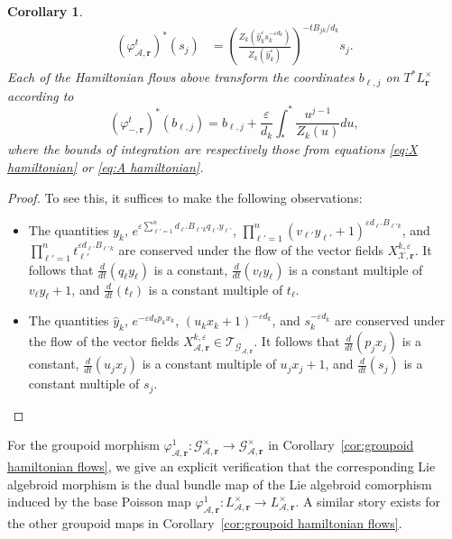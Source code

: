 \documentclass{amsart}
\newtheorem{corollary}[theorem]{Corollary}
\numberwithin{equation}{section}
\newcommand{\bfr}{{\boldsymbol{r}}}
\newcommand{\cA}{\mathcal{A}}
\newcommand{\cG}{\mathcal{G}}
\newcommand{\cT}{\mathcal{T}}
\newcommand{\cX}{\mathcal{X}}
\begin{document}
\begin{corollary}
\begin{align*}
    (\varphi_{\cA,\bfr}^t)^*(s_j)&=\left(\frac{Z_k\left(\hat y_k^\varepsilon s_k^{-\varepsilon d_k}\right)}{Z_k(\hat y_k^\varepsilon)}\right)^{-tB_{jk}/d_k}s_j.
  \end{align*}
  Each of the Hamiltonian flows above transform the coordinates $b_{\ell,j}$ on $T^*L^\times_\bfr$ according to
  \begin{equation*}
    (\varphi_{-,\bfr}^t)^*(b_{\ell,j})=b_{\ell,j}+\frac{\varepsilon}{d_k}\int_*^* \frac{u^{j-1}}{Z_k(u)}du,
  \end{equation*}
  where the bounds of integration are respectively those from equations \eqref{eq:X hamiltonian} or \eqref{eq:A hamiltonian}.
\end{corollary}
\begin{proof}
  To see this, it suffices to make the following observations:
  \begin{itemize}
    \item The quantities $y_k$, $e^{\varepsilon\sum_{\ell'=1}^n d_{\ell'} B_{\ell' k}q_{\ell'} y_{\ell'}}$, $\prod_{\ell'=1}^n (v_{\ell'}y_{\ell'}+1)^{\varepsilon d_{\ell'} B_{\ell' k}}$, and $\prod_{\ell'=1}^nt_{\ell'}^{\varepsilon d_{\ell'} B_{\ell' k}}$ are conserved under the flow of the vector fields $X_{\cX,\bfr}^{k,\varepsilon}$.
      It follows that $\frac{d}{dt}(q_\ell y_\ell)$ is a constant, $\frac{d}{dt}(v_\ell y_\ell)$ is a constant multiple of $v_\ell y_\ell+1$, and $\frac{d}{dt}(t_\ell)$ is a constant multiple of $t_\ell$.
    \item The quantities $\hat y_k$, $e^{-\varepsilon d_kp_kx_k}$, $(u_kx_k+1)^{-\varepsilon d_k}$, and $s_k^{-\varepsilon d_k}$ are conserved under the flow of the vector fields $X_{\cA,\bfr}^{k,\varepsilon}\in\cT_{\cG_{\cA,\bfr}}$.
      It follows that $\frac{d}{dt}(p_jx_j)$ is a constant, $\frac{d}{dt}(u_j x_j)$ is a constant multiple of $u_j x_j+1$, and $\frac{d}{dt}(s_j)$ is a constant multiple of $s_j$.
  \end{itemize}
\end{proof}

For the groupoid morphism $\varphi_{\cA,\bfr}^1: \cG^\times_{\cA,\bfr} \to \cG^\times_{\cA,\bfr}$ in Corollary~\ref{cor:groupoid hamiltonian flows}, we give an explicit verification that the corresponding Lie algebroid morphism is the dual bundle map of the Lie algebroid comorphism induced by the base Poisson map $\varphi_{\cA,\bfr}^1:L^\times_{\cA,\bfr}\to L^\times_{\cA,\bfr}$.
A similar story exists for the other groupoid maps in Corollary~\ref{cor:groupoid hamiltonian flows}.
\end{document}
